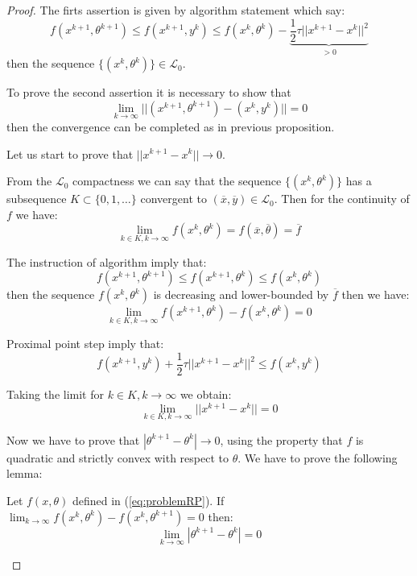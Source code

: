 \begin{proof}
The firts assertion is given by algorithm statement which say:
\begin{equation}
f(x^{k+1},\theta^{k+1})\le f(x^{k+1},y^k)\le f(x^k,\theta^k)- \underbrace{\frac{1}{2}\tau ||x^{k+1}-x^{k}||^2}_{>0}
\end{equation}
then the sequence $\{(x^k,\theta^k)\} \in \mathcal{L}_0$.

To prove the second assertion it is necessary to show that
\begin{equation}
\lim_{k \rightarrow \infty} ||(x^{k+1},\theta^{k+1})-(x^{k},y^{k})||=0
\end{equation}
then the convergence can be completed as in previous proposition.

Let us start to prove that $||x^{k+1}-x^{k}||\to0$.

From the $\mathcal{L}_0$ compactness we can say that the sequence $\{(x^k,\theta^k)\}$ has a subsequence $K \subset \{0,1,\ldots\}$ convergent to $(\overline{x},\overline{y}) \in \mathcal{L}_0$. Then for the continuity of $f$ we have:
\begin{equation}
\lim_{k \in K, k \rightarrow \infty}f(x^k,\theta^k)=f(\overline{x},\overline{\theta})= \overline{f}
\end{equation}

The instruction of algorithm imply that:
\begin{equation}
f(x^{k+1},\theta^{k+1})\le f(x^{k+1},\theta^{k})\le f(x^k,\theta^k)
\end{equation}
then the sequence $f(x^k,\theta^k)$ is decreasing and lower-bounded by $\overline{f}$ then we have:
\begin{equation}
\lim_{k \in K, k \rightarrow \infty} f(x^{k+1},\theta^{k})-f(x^{k},\theta^{k})=0
\end{equation}

Proximal point step imply that:
\begin{equation}
f(x^{k+1},y^{k})+\frac{1}{2}\tau||x^{k+1}-x^{k}||^2 \le f(x^{k},y^{k})
\end{equation}

Taking the limit for $k \in K, k \to \infty$ we obtain:
\begin{equation}
\lim_{k \in K,k \to \infty} ||x^{k+1}-x^{k}||=0
\end{equation}

Now we have to prove that $|\theta^{k+1}-\theta^{k}|\to 0$, using the property that $f$ is quadratic and strictly convex with respect to $\theta$. 
We have to prove the following lemma:
\begin{lemma}
Let $f(x, \theta)$ defined in (\ref{eq:problemRP}). If $\lim_{k \to \infty} f(x^{k},\theta^k)-f(x^{k},\theta^{k+1})=0$ then:
\begin{equation}
 \lim_{k\to \infty} |\theta^{k+1} -\theta^k| = 0 
\end{equation}
\end{lemma}


\end{proof}
